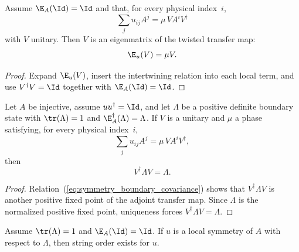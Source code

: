\begin{theorem}%
    \label{thm:twisted_transfer_eigen_of_virtual_unitary}
    \leanok
    Assume $\E_A(\Id)=\Id$ and that, for every physical index~$i$,
    \[
        \sum_j u_{ij} A^j = \mu\, V A^i V^\dagger
    \]
    with $V$ unitary.
    Then $V$ is an eigenmatrix of the twisted transfer map:
    \[
        \E_u(V) = \mu V.
    \]
\end{theorem}

\begin{proof}
    \leanok
    Expand $\E_u(V)$, insert the intertwining relation into each local term,
    and use $V^\dagger V = \Id$ together with $\E_A(\Id)=\Id$.
\end{proof}

\begin{theorem}%
    \label{thm:boundary_state_invariant_of_virtual_unitary}
    \leanok
    Let $A$ be injective, assume $u u^\dagger = \Id$, and let $\Lambda$ be a
    positive definite boundary state with $\tr(\Lambda)=1$ and
    $\E_A^\dagger(\Lambda)=\Lambda$.
    If $V$ is a unitary and $\mu$ a phase satisfying, for every physical
    index~$i$,
    \begin{equation}\label{eq:symmetry_boundary_covariance}
        \sum_j u_{ij} A^j = \mu\, V A^i V^\dagger,
    \end{equation}
    then
    \[
        V^\dagger \Lambda V = \Lambda.
    \]
\end{theorem}

\begin{proof}
    \leanok
    Relation~(\ref{eq:symmetry_boundary_covariance}) shows that
    $V^\dagger \Lambda V$ is another positive
    fixed point of the adjoint transfer map.
    Since $\Lambda$ is the normalized positive fixed point, uniqueness forces
    $V^\dagger \Lambda V = \Lambda$.
\end{proof}

\begin{lemma}%
    \label{lem:has_string_order_of_local_symmetry}
    \leanok
    Assume $\tr(\Lambda)=1$ and $\E_A(\Id)=\Id$.
    If $u$ is a local symmetry of $A$ with respect to $\Lambda$, then string
    order exists for $u$.
\end{lemma}

